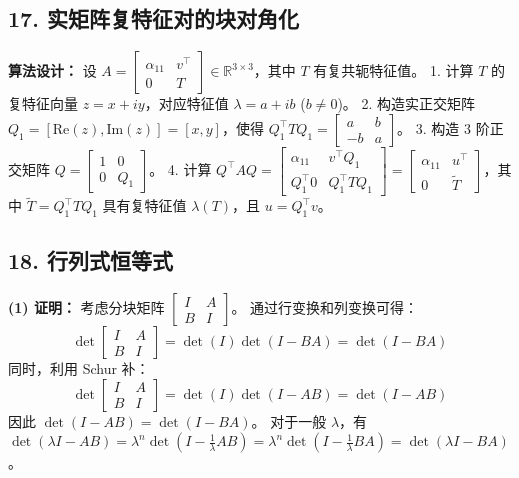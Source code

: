 \documentclass{article}
\begin{document}
\subsection*{17. 实矩阵复特征对的块对角化}
\textbf{算法设计：}
设 \(A = \begin{bmatrix} \alpha_{11} & v^\top \\ 0 & T \end{bmatrix} \in \mathbb{R}^{3 \times 3}\)，其中 \(T\) 有复共轭特征值。
1. 计算 \(T\) 的复特征向量 \(z = x + iy\)，对应特征值 \(\lambda = a + ib\) (\(b \neq 0\))。
2. 构造实正交矩阵 \(Q_1 = [\text{Re}(z), \text{Im}(z)] = [x, y]\)，使得 \(Q_1^\top T Q_1 = \begin{bmatrix} a & b \\ -b & a \end{bmatrix}\)。
3. 构造 3 阶正交矩阵 \(Q = \begin{bmatrix} 1 & 0 \\ 0 & Q_1 \end{bmatrix}\)。
4. 计算 \(Q^\top A Q = \begin{bmatrix} \alpha_{11} & v^\top Q_1 \\ Q_1^\top 0 & Q_1^\top T Q_1 \end{bmatrix} = \begin{bmatrix} \alpha_{11} & u^\top \\ 0 & \tilde{T} \end{bmatrix}\)，其中 \(\tilde{T} = Q_1^\top T Q_1\) 具有复特征值 \(\lambda(T)\)，且 \(u = Q_1^\top v\)。

\subsection*{18. 行列式恒等式}
\textbf{(1) 证明：}
考虑分块矩阵 \(\begin{bmatrix} I & A \\ B & I \end{bmatrix}\)。
通过行变换和列变换可得：
\[
 \det \begin{bmatrix} I & A \\ B & I \end{bmatrix} = \det(I) \det(I - BA) = \det(I - BA) 
\]
同时，利用 Schur 补：
\[
 \det \begin{bmatrix} I & A \\ B & I \end{bmatrix} = \det(I) \det(I - AB) = \det(I - AB) 
\]
因此 \(\det(I - AB) = \det(I - BA)\)。
对于一般 \(\lambda\)，有 \(\det(\lambda I - AB) = \lambda^n \det(I - \frac{1}{\lambda} AB) = \lambda^n \det(I - \frac{1}{\lambda} BA) = \det(\lambda I - BA)\)。
\end{document}
